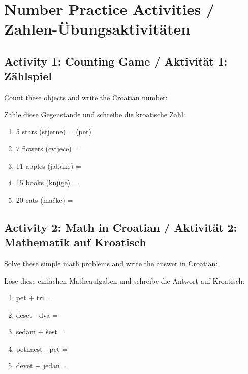 \section{Number Practice Activities / Zahlen-Übungsaktivitäten}

\begin{exercise}
\subsection*{Activity 1: Counting Game / Aktivität 1: Zählspiel}

Count these objects and write the Croatian number:

Zähle diese Gegenstände und schreibe die kroatische Zahl:

\begin{enumerate}
    \item 5 stars (stjerne) = \underline{\hspace{3cm}} (pet)
    \item 7 flowers (cvijeće) = \underline{\hspace{3cm}}
    \item 11 apples (jabuke) = \underline{\hspace{3cm}}
    \item 15 books (knjige) = \underline{\hspace{3cm}}
    \item 20 cats (mačke) = \underline{\hspace{3cm}}
\end{enumerate}

\subsection*{Activity 2: Math in Croatian / Aktivität 2: Mathematik auf Kroatisch}

Solve these simple math problems and write the answer in Croatian:

Löse diese einfachen Matheaufgaben und schreibe die Antwort auf Kroatisch:

\begin{enumerate}
    \item pet + tri = \underline{\hspace{3cm}}
    \item deset - dva = \underline{\hspace{3cm}}
    \item sedam + šest = \underline{\hspace{3cm}}
    \item petnaest - pet = \underline{\hspace{3cm}}
    \item devet + jedan = \underline{\hspace{3cm}}
\end{enumerate}


\end{exercise}
